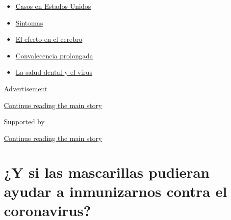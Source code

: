 \begin{itemize}
\tightlist
\item
  \href{https://www.nytimes3xbfgragh.onion/es/interactive/2020/espanol/mundo/coronavirus-en-estados-unidos.html?name=styln-coronavirus-es\&region=TOP_BANNER\&block=storyline_menu_recirc\&action=click\&pgtype=Article\&impression_id=cf6de280-f52d-11ea-bb28-3d3dfc9ceefd\&variant=undefined}{Casos
  en Estados Unidos}
\item
  \href{https://www.nytimes3xbfgragh.onion/es/interactive/2020/08/06/espanol/ciencia-y-tecnologia/tengo-covid-19-sintomas.html?name=styln-coronavirus-es\&region=TOP_BANNER\&block=storyline_menu_recirc\&action=click\&pgtype=Article\&impression_id=cf6de281-f52d-11ea-bb28-3d3dfc9ceefd\&variant=undefined}{Síntomas}
\item
  \href{https://www.nytimes3xbfgragh.onion/es/2020/09/11/espanol/ciencia-y-tecnologia/cerebro-coronavirus.html?name=styln-coronavirus-es\&region=TOP_BANNER\&block=storyline_menu_recirc\&action=click\&pgtype=Article\&impression_id=cf6de282-f52d-11ea-bb28-3d3dfc9ceefd\&variant=undefined}{El
  efecto en el cerebro}
\item
  \href{https://www.nytimes3xbfgragh.onion/es/2020/09/09/espanol/ciencia-y-tecnologia/salud-mental-coronavirus.html?name=styln-coronavirus-es\&region=TOP_BANNER\&block=storyline_menu_recirc\&action=click\&pgtype=Article\&impression_id=cf6de283-f52d-11ea-bb28-3d3dfc9ceefd\&variant=undefined}{Convalecencia
  prolongada}
\item
  \href{https://www.nytimes3xbfgragh.onion/es/2020/09/08/espanol/ciencia-y-tecnologia/dentistas-covid-dientes.html?name=styln-coronavirus-es\&region=TOP_BANNER\&block=storyline_menu_recirc\&action=click\&pgtype=Article\&impression_id=cf6e0990-f52d-11ea-bb28-3d3dfc9ceefd\&variant=undefined}{La
  salud dental y el virus}
\end{itemize}

Advertisement

\protect\hyperlink{after-top}{Continue reading the main story}

Supported by

\protect\hyperlink{after-sponsor}{Continue reading the main story}

\hypertarget{y-si-las-mascarillas-pudieran-ayudar-a-inmunizarnos-contra-el-coronavirus}{%
\section{¿Y si las mascarillas pudieran ayudar a inmunizarnos contra el
coronavirus?}\label{y-si-las-mascarillas-pudieran-ayudar-a-inmunizarnos-contra-el-coronavirus}}

